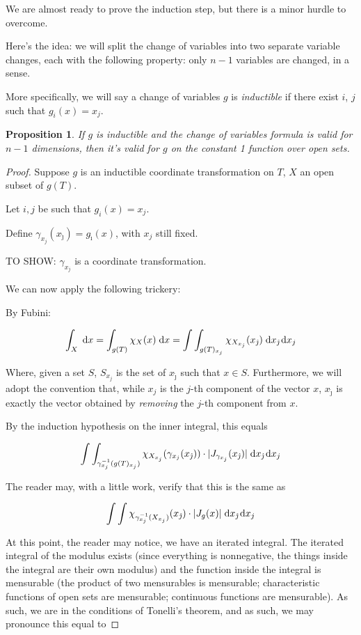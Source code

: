 \documentclass[11pt]{article}
\theoremstyle{definition}
\theoremstyle{plain}
\newtheorem{prop}{Proposition}
\newcommand{\mo}{^{-1}}
\begin{document}
We are almost ready to prove the induction step, but there is a minor hurdle to overcome.

Here's the idea: we will split the change of variables into two separate variable changes, each with the following property: only $n-1$ variables are changed, in a sense. %

More specifically, we will say a change of variables $g$ is \emph{inductible} if there exist $i$, $j$ such that $g_i(x) = x_j$.

\begin{prop}
If $g$ is inductible and the change of variables formula is valid for $n-1$ dimensions, then it's valid for $g$ on the constant 1 function over open sets.
\end{prop}

\begin{proof}
Suppose $g$ is an inductible coordinate transformation on $T$, $X$ an open subset of $g(T)$.

Let $i, j$ be such that $g_i(x) = x_j$.

Define $\gamma_{x_j}(x_{\hat\jmath}) = g_{\hat\imath}(x)$, with $x_j$ still fixed.

TO SHOW: $\gamma_{x_j}$ is a coordinate transformation.

We can now apply the following trickery:

By Fubini:

\[\int_X \d x = \int_{g(T)} \chi_X(x) \d x = \int \int_{g(T)_{x_j}} \chi_{X_{x_j}}(x_{\hat\jmath}) \d{x_{\hat\jmath}} \d{x_j}\]

Where, given a set $S$, $S_{x_j}$ is the set of $x_{\hat\jmath}$ such that $x \in S$. Furthermore, we will adopt the convention that, while $x_j$ is the $j$-th component of the vector $x$, $x_{\hat\jmath}$ is exactly the vector obtained by \emph{removing} the $j$-th component from $x$.

By the induction hypothesis on the inner integral, this equals

\[ \int \int_{\gamma_{x_j}\mo(g(T)_{x_j})} \chi_{X_{x_j}}(\gamma_{x_j}(x_{\hat\jmath})) \cdot \lvert J_{\gamma_{x_j}}(x_{\hat\jmath}) \rvert \d{x_{\hat\jmath}} \d{x_j} \]

The reader may, with a little work, verify that this is the same as

\[ \int \int \chi_{\gamma_{x_j}\mo(X_{x_j})}(x_{\hat\jmath}) \cdot \lvert J_g(x) \rvert \d{x_{\hat\jmath}} \d{x_j}  \]

At this point, the reader may notice, we have an iterated integral. The iterated integral of the modulus exists (since everything is nonnegative, the things inside the integral are their own modulus) and the function inside the integral is mensurable (the product of two mensurables is mensurable; characteristic functions of open sets are mensurable; continuous functions are mensurable). As such, we are in the conditions of Tonelli's theorem, and as such, we may pronounce this equal to


\end{proof}
\end{document}
